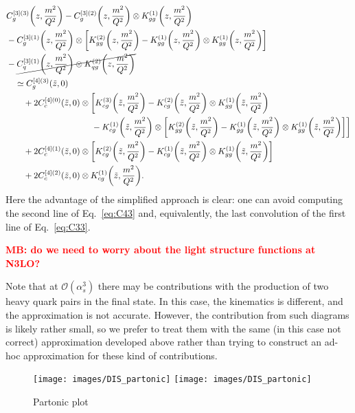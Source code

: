 \documentclass[a4paper,10pt]{article}
\newcommand{\zapp}{\tilde z}
\newcommand{\as}{\alpha_s}
\newcommand{\Ord}{\mathcal{O}}
\let\originalleft\left
\let\originalright\right
\renewcommand{\left}{\mathopen{}\mathclose\bgroup\originalleft}
\renewcommand{\right}{\aftergroup\egroup\originalright}
\def\({\left(}
\def\){\right)}
\def\[{\left[}
\def\]{\right]}
\newcommand{\MB}[1]{\textbf{\textcolor{red}   {MB: #1}}}
\begin{document}
\begin{align}
&C_g^{[3](3)}\(z,\frac{m^2}{Q^2}\) -C_g^{[3](2)}\(z,\frac{m^2}{Q^2}\)\otimes K_{gg}^{(1)}\(z,\frac{m^2}{Q^2}\)
\nonumber\\ &
-C_g^{[3](1)}\(z,\frac{m^2}{Q^2}\)\otimes \[K_{gg}^{(2)}\(z,\frac{m^2}{Q^2}\)-K_{gg}^{(1)}\(z,\frac{m^2}{Q^2}\)\otimes K_{gg}^{(1)}\(z,\frac{m^2}{Q^2}\)\]
\nonumber\\ &
-\cancel{C_q^{[3](1)}\(z,\frac{m^2}{Q^2}\)\otimes K_{qg}^{(2)}\(z,\frac{m^2}{Q^2}\)}
\nonumber\\ &\quad
\simeq C_g^{[4](3)}(\zapp,0)
\nonumber\\ &\qquad
+ 2C_c^{[4](0)}(\zapp,0)\otimes \bigg[K_{cg}^{(3)}\(\zapp,\frac{m^2}{Q^2}\)-K_{cg}^{(2)}\(\zapp,\frac{m^2}{Q^2}\)\otimes K_{gg}^{(1)}\(\zapp,\frac{m^2}{Q^2}\)
\nonumber\\ &\qquad\qquad\qquad\qquad\qquad
-K_{cg}^{(1)}\(\zapp,\frac{m^2}{Q^2}\)\otimes \[K_{gg}^{(2)}\(\zapp,\frac{m^2}{Q^2}\) - K_{gg}^{(1)}\(\zapp,\frac{m^2}{Q^2}\) \otimes K_{gg}^{(1)}\(\zapp,\frac{m^2}{Q^2}\)\]\bigg]
\nonumber\\ &\qquad
+2C_c^{[4](1)}(\zapp,0)\otimes \[K_{cg}^{(2)}\(\zapp,\frac{m^2}{Q^2}\)-K_{cg}^{(1)}\(\zapp,\frac{m^2}{Q^2}\)\otimes K_{gg}^{(1)}\(\zapp,\frac{m^2}{Q^2}\)\]
\nonumber\\ &\qquad
+2C_c^{[4](2)}(\zapp,0)\otimes K_{cg}^{(1)}\(\zapp,\frac{m^2}{Q^2}\).
\end{align}
Here the advantage of the simplified approach is clear: one can avoid computing the second line of Eq.~\eqref{eq:C43}
and, equivalently, the last convolution of the first line of Eq.~\eqref{eq:C33}.

\MB{do we need to worry about the light structure functions at N3LO?}

Note that at $\Ord(\as^3)$ there may be contributions with the production of two heavy quark pairs in the final state.
In this case, the kinematics is different, and the approximation is not accurate.
However, the contribution from such diagrams is likely rather small, so we prefer to treat them with the same (in this case not correct) approximation developed above rather than trying to construct an ad-hoc approximation for these kind of contributions.


\begin{figure}[t]
  \centering
  \texttt{[image: images/DIS\_partonic]}
  \texttt{[image: images/DIS\_partonic]}
  \caption{Partonic plot}
  \label{fig:partonic}
\end{figure}
\end{document}
